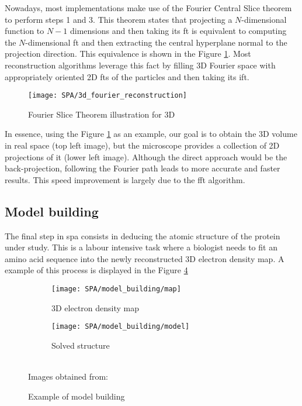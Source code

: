 \documentclass[../main.tex]{subfiles}
\begin{document}
Nowadays, most implementations make use of the Fourier Central Slice theorem to perform steps 1 and 3. This theorem states that projecting a $N$-dimensional function to $N-1$ dimensions and then taking its \gls{ft} is equivalent to computing the $N$-dimensional \gls{ft} and then extracting the central hyperplane normal to the projection direction. This equivalence is shown in the Figure \ref{fig:2:3dfourier}. Most reconstruction algorithms leverage this fact by filling 3D Fourier space with appropriately oriented 2D \glspl{ft} of the particles and then taking its \gls{ift}.

\begin{figure}[htbp]
    \centering
    \texttt{[image: SPA/3d\_fourier\_reconstruction]}\\
    \cite{nogales2015}
    \caption{Fourier Slice Theorem illustration for 3D}
    \label{fig:2:3dfourier}
\end{figure}

In essence, using the Figure \ref{fig:2:3dfourier} as an example, our goal is to obtain the 3D volume in real space (top left image), but the microscope provides a collection of 2D projections of it (lower left image). Although the direct approach would be the back-projection, following the Fourier path leads to more accurate and faster results. This speed improvement is largely due to the \gls{fft} algorithm.

\subsection{Model building}
The final step in \gls{spa} consists in deducing the atomic structure of the protein under study. This is a labour intensive task where a biologist needs to fit an amino acid sequence into the newly reconstructed 3D electron density map. A example of this process is displayed in the Figure \ref{fig:2:model_building}

\begin{figure}[htbp]
    \centering
    \begin{subfigure}[b]{0.3\textwidth}
         \centering
         \texttt{[image: SPA/model\_building/map]}
         \caption{3D electron density map}
         \label{fig:2:model_building:map}
    \end{subfigure}
    \begin{subfigure}[b]{0.3\textwidth}
         \centering
         \texttt{[image: SPA/model\_building/model]}
         \caption{Solved structure}
         \label{fig:2:model_building:model}
    \end{subfigure}\\
    Images obtained from: \cite{pfab2020}
    \caption{Example of model building}
    \label{fig:2:model_building}
\end{figure}
\end{document}
